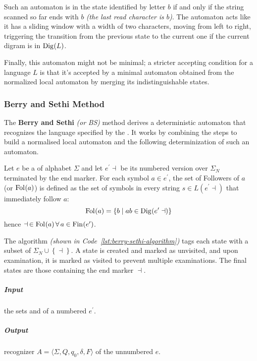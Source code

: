 \documentclass[english]{article}
\begin{document}
Such an automaton is in the state identified by letter \(b\) if and only if the string scanned so far ends with \(b\) \textit{(the last read character is \(b\))}.
The automaton acts like it has a sliding window with a width of two characters, moving from left to right, triggering the transition from the previous state to the current one if the current digram is in \(\text{Dig}\hspace{0.1ex}(L)\).

Finally, this automaton might not be minimal;
a stricter accepting condition for a language \(L\) is that it's accepted by a minimal automaton obtained from the normalized local automaton by merging its indistinguishable states.

\subsubsection{Berry and Sethi Method}

The \textbf{Berry and Sethi} \textit{(or BS)} method derives a deterministic automaton that recognizes the language specified by the \re.
It works by combining the steps to build a normalised local automaton and the following determinization of such an automaton.

Let \(e\) be a \re of alphabet \(\Sigma\) and let \(e^\prime \dashv\) be its numbered version over \(\Sigma_N\) terminated by the end marker.
For each symbol \(a \in e^\prime\), the set of Followers of \(a\) (or \(\text{Fol}\hspace{0.1ex}(a)\)) is defined as the set of symbols in every string \(s \in L(e^\prime \dashv)\) that immediately follow \(a\):
\[ \text{Fol}\hspace{0.1ex}(a) = \left\{ b \mid ab \in \text{Dig}\hspace{0.1ex}(e^\prime \dashv) \right\} \]
hence \( \dashv \, \in \text{Fol}\hspace{0.1ex}(a) \, \forall \, a \in \text{Fin}\hspace{0.1ex}(e^\prime) \).

The algorithm \textit{(shown in Code~\ref{lst:berry-sethi-algorithm})} tags each state with a subset of \(\Sigma_N \cup \left\{ \dashv \right\}\).
A state is created and marked as unvisited, and upon examination, it is marked as visited to prevent multiple examinations.
The final states are those containing the end marker \(\dashv\).

\subparagraph*{Input}
the sets \Ini and \Fol of a numbered \re \(e^\prime\).

\subparagraph*{Output}
recognizer \(A = \langle \Sigma, Q, q_0, \delta,  F \rangle\) of the unnumbered \re \(e\).
\end{document}
